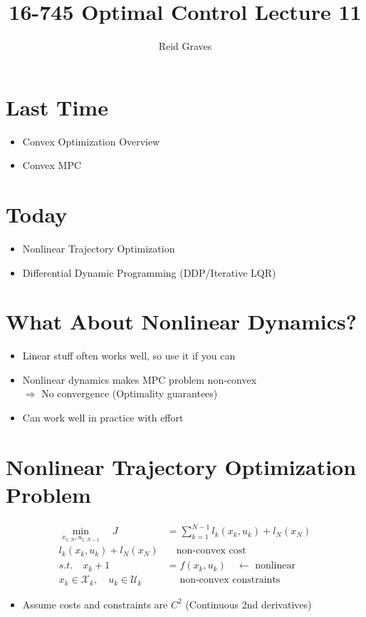 \documentclass[11pt]{article}
\title{16-745 Optimal Control Lecture 11}
\author{Reid Graves}
\begin{document}
\maketitle

\section{Last Time}
\begin{itemize}
    \item Convex Optimization Overview
    \item Convex MPC
\end{itemize}

\section{Today}
\begin{itemize}
    \item Nonlinear Trajectory Optimization
    \item Differential Dynamic Programming (DDP/Iterative LQR)
\end{itemize}

\section{What About Nonlinear Dynamics?}
\begin{itemize}
    \item Linear stuff often works well, so use it if you can
    \item Nonlinear dynamics makes MPC problem non-convex \\
    $\Rightarrow$ No convergence (Optimality guarantees)
    \item Can work well in practice with effort
\end{itemize}

\section{Nonlinear Trajectory Optimization Problem}
\begin{align*}
    \min_{x_{1:N},u_{1:N-1}} \quad J &= \sum_{k=1}^{N-1}l_k(x_k,u_k) + l_N(x_N)
    \\
    l_k(x_k,u_k) + l_N(x_N) &\quad \text{non-convex cost}
    \\
    s.t. \quad x_k+1 &= f(x_k,u_k) \quad \leftarrow \text{ nonlinear}
    \\
    x_k \in \mathcal{X}_k, \quad u_k \in \mathcal{U}_k &\quad \text{ non-convex constraints}
\end{align*}
\begin{itemize}
    \item Assume costs and constraints are $C^2$ (Continuous 2nd derivatives)
\end{itemize}
\end{document}
